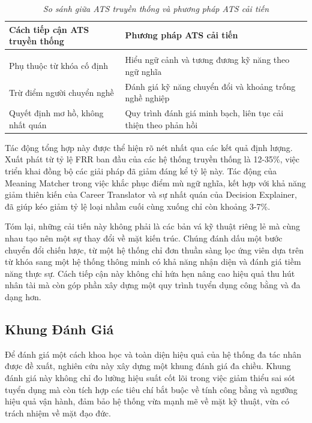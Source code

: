 \documentclass{article}
\begin{document}
\begin{longtable}{|
  >{\raggedright\arraybackslash}p{}|
  >{\raggedright\arraybackslash}p{}|}
  \hline
  \textbf{Cách tiếp cận ATS truyền thống} &
  \textbf{Phương pháp ATS cải tiến} \\
  \hline
  \endfirsthead

  \endhead

  \hline
  \endfoot

  \hline
  \caption{\centering\textit{So sánh giữa ATS truyền thống và phương pháp ATS cải tiến}}
  \label{tab:ats-compare-methods} \\
  \endlastfoot

  Phụ thuộc từ khóa cố định &
  Hiểu ngữ cảnh và tương đương kỹ năng theo ngữ nghĩa \\
  \hline

  Trừ điểm người chuyển nghề &
  Đánh giá kỹ năng chuyển đổi và khoảng trống nghề nghiệp \\
  \hline

  Quyết định mơ hồ, không nhất quán &
  Quy trình đánh giá minh bạch, liên tục cải thiện theo phản hồi \\
\end{longtable}
Tác động tổng hợp này được thể hiện rõ nét nhất qua các kết quả định lượng. Xuất phát từ tỷ lệ FRR ban đầu của các hệ thống truyền thống là 12-35\%, việc triển khai đồng bộ các giải pháp đã giảm đáng kể tỷ lệ này. Tác động của Meaning Matcher trong việc khắc phục điểm mù ngữ nghĩa, kết hợp với khả năng giảm thiên kiến của Career Translator và sự nhất quán của Decision Explainer, đã giúp kéo giảm tỷ lệ loại nhầm cuối cùng xuống chỉ còn khoảng 3-7\%.

Tóm lại, những cải tiến này không phải là các bản vá kỹ thuật riêng lẻ mà cùng nhau tạo nên một sự thay đổi về mặt kiến trúc. Chúng đánh dấu một bước chuyển đổi chiến lược, từ một hệ thống chỉ đơn thuần sàng lọc ứng viên dựa trên từ khóa sang một hệ thống thông minh có khả năng nhận diện và đánh giá tiềm năng thực sự. Cách tiếp cận này không chỉ hứa hẹn nâng cao hiệu quả thu hút nhân tài mà còn góp phần xây dựng một quy trình tuyển dụng công bằng và đa dạng hơn.
\subsection{Khung Đánh Giá}
Để đánh giá một cách khoa học và toàn diện hiệu quả của hệ thống đa tác nhân được đề xuất, nghiên cứu này xây dựng một khung đánh giá đa chiều. Khung đánh giá này không chỉ đo lường hiệu suất cốt lõi trong việc giảm thiểu sai sót tuyển dụng mà còn tích hợp các tiêu chí bắt buộc về tính công bằng và ngưỡng hiệu quả vận hành, đảm bảo hệ thống vừa mạnh mẽ về mặt kỹ thuật, vừa có trách nhiệm về mặt đạo đức.
\end{document}

